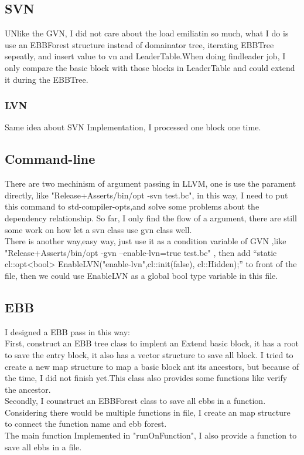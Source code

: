 \subsection{SVN} 
UNlike  the GVN, I did not care about the load emiliatin so much, what
I do is use an EBBForest structure instead of domainator tree, iterating
EBBTree sepeatly, and insert value to vn and LeaderTable.When
doing findleader job, I only compare the basic block with those blocks
 in LeaderTable and could extend it during the EBBTree.  

\subsubsection{LVN} 
Same idea about SVN Implementation, I processed one block one time. 
 
\subsection{Command-line}
There are two mechinism of argument passing in LLVM, one is use the
parament directly, like "Release+Asserts/bin/opt -svn test.bc", 
in this way, I  need to put this command to std-compiler-opts,and
solve some problems about the dependency relationship. So far, I only
find the flow of a argument, there are still some work on how let a
svn class use gvn class well.\\ 
There is another  way,easy way, just use it as a condition variable of GVN
,like "Release+Asserts/bin/opt -gvn --enable-lvn=true test.bc" ,
 then add “static cl::opt<bool> EnableLVN("enable-lvn",cl::init(false), cl::Hidden);”
to front of the file, then we could use EnableLVN as a global bool
type variable in this file.
\subsection{EBB} 
I designed a EBB pass in this way:\\
First, construct an EBB tree class to implent an Extend basic block,
it has a root to save the entry block, it also has a vector structure
to save all block. I tried to create a new map structure to 
map a basic block ant its ancestors, but because of the time,
I did not finish yet.This class also provides some functions like
verify the ancestor. \\
Secondly, I counstruct an EBBForest class to save all ebbs in a
function. Considering there would be multiple functions in file,
I create an map structure to connect the function name and ebb forest.
\\
The main function Implemented in "runOnFunction", I also provide a
function to save all ebbs in a file.

